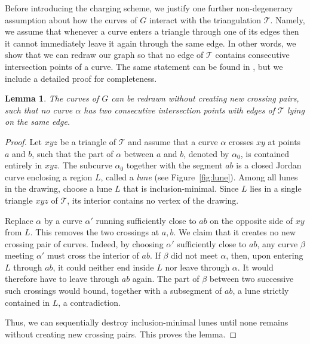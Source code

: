 \documentclass[11pt]{amsart}
\newtheorem{lemma}[theorem]{Lemma}
\theoremstyle{definition}
\newcommand{\cT}{\mathcal{T}}
\begin{document}
Before introducing the charging scheme, we justify one further non-degeneracy assumption about how the curves of $G$ interact with the triangulation $\mathcal{T}$.
Namely, we assume that whenever a curve enters a triangle through one of its edges then it cannot immediately leave it again through the same edge.
In other words, we show that we can redraw our graph so that no edge of $\cT$ contains consecutive intersection points of a curve.
The same statement can be found in \cite{PTZ}, but we include a detailed proof for completeness.

\begin{lemma}\label{lemma:cleaning}
The curves of $G$ can be redrawn without creating new crossing pairs, such that no curve $\alpha$ has two consecutive intersection points with edges of $\mathcal{T}$ lying on the same edge.  
\end{lemma}
\begin{proof}
Let $xyz$ be a triangle of $\cT$ and assume that a curve $\alpha$  crosses $xy$ at points $a$ and $b$, such that the part of $\alpha$ between $a$ and $b$, denoted by $\alpha_0$, is contained entirely in $xyz$. The subcurve $\alpha_0$ together with the segment $ab$ is a closed Jordan curve enclosing a region $L$, called a \emph{lune} (see Figure~\ref{fig:lune}). Among all lunes in the drawing, choose a lune $L$  that is inclusion-minimal. Since $L$ lies in a single triangle $xyz$ of $\cT$, its interior contains no vertex of the drawing.

Replace $\alpha$ by a curve $\alpha'$ running sufficiently close to $ab$ on
the opposite side of $xy$ from $L$. This removes the two crossings at $a,b$.
We claim that it creates no new crossing pair of curves. Indeed,
by choosing $\alpha'$ sufficiently close to $ab$, any curve $\beta$ meeting
$\alpha'$ must cross the interior of $ab$. If $\beta$ did not meet $\alpha$,
then, upon entering $L$ through $ab$, it could neither end inside $L$ nor
leave through $\alpha$. It would therefore have to leave through $ab$ again.
The part of $\beta$ between two successive such crossings would bound,
together with a subsegment of $ab$, a lune strictly contained in $L$, a
contradiction.

Thus, we can sequentially destroy inclusion-minimal lunes until none remains without creating new crossing pairs. This proves the lemma.
\end{proof}
\end{document}
